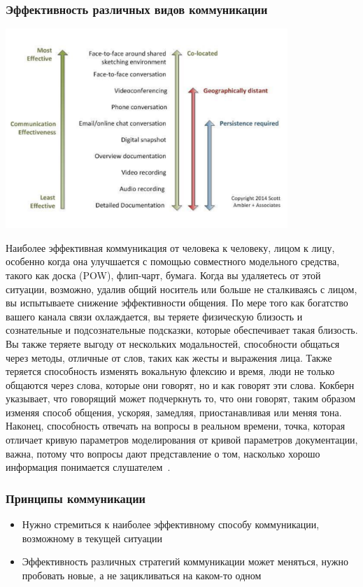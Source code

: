 \documentclass{../industrial-development}
\begin{document}
\begin{frame} \frametitle{Эффективность различных видов коммуникации}
\centerline{\includegraphics[width=0.8\textwidth]{CommunicationEffectiveness.pdf}}
\end{frame}

\lecturenotes

Наиболее эффективная коммуникация от человека к человеку, лицом к лицу, особенно когда она улучшается с помощью совместного модельного средства, такого как доска (POW), флип-чарт, бумага. Когда вы удаляетесь от этой ситуации, возможно, удалив общий носитель или больше не сталкиваясь с лицом, вы испытываете снижение эффективности общения. По мере того как богатство вашего канала связи охлаждается, вы теряете физическую близость и сознательные и подсознательные подсказки, которые обеспечивает такая близость. Вы также теряете выгоду от нескольких модальностей, способности общаться через методы, отличные от слов, таких как жесты и выражения лица. Также теряется способность изменять вокальную флексию и время, люди не только общаются через слова, которые они говорят, но и как говорят эти слова. Кокберн указывает, что говорящий может подчеркнуть то, что они говорят, таким образом изменяя способ общения, ускоряя, замедляя, приостанавливая или меняя тона. Наконец, способность отвечать на вопросы в реальном времени, точка, которая отличает кривую параметров моделирования от кривой параметров документации, важна, потому что вопросы дают представление о том, насколько хорошо информация понимается слушателем~\cite{AgileComm}.

\begin{frame} \frametitle{Принципы коммуникации}
  \begin{itemize}
  \item Нужно стремиться к наиболее эффективному способу коммуникации, возможному в текущей ситуации
  \item Эффективность различных стратегий коммуникации может меняться, нужно пробовать новые, а не зацикливаться на каком-то одном
  \end{itemize}
\end{frame}
\end{document}

